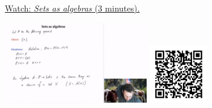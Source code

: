 
\begin{minipage}{10cm}
    \href{https://act4e-spring21.netlify.app/videos/spring2021-operads-b:sets-algebras.html}{Watch: \emph{Sets as algebras} (3 minutes).}
        
    \href{https://act4e-spring21.netlify.app/videos/spring2021-operads-b:sets-algebras.html}{\includegraphics[height=3.5cm]{spring2021-operads-b:sets-algebras/thumbnails.jpg}}
    \href{https://act4e-spring21.netlify.app/videos/spring2021-operads-b:sets-algebras.html}{\includegraphics[height=2.5cm]{spring2021-operads-b:sets-algebras/qrcode.png}}
\end{minipage}
